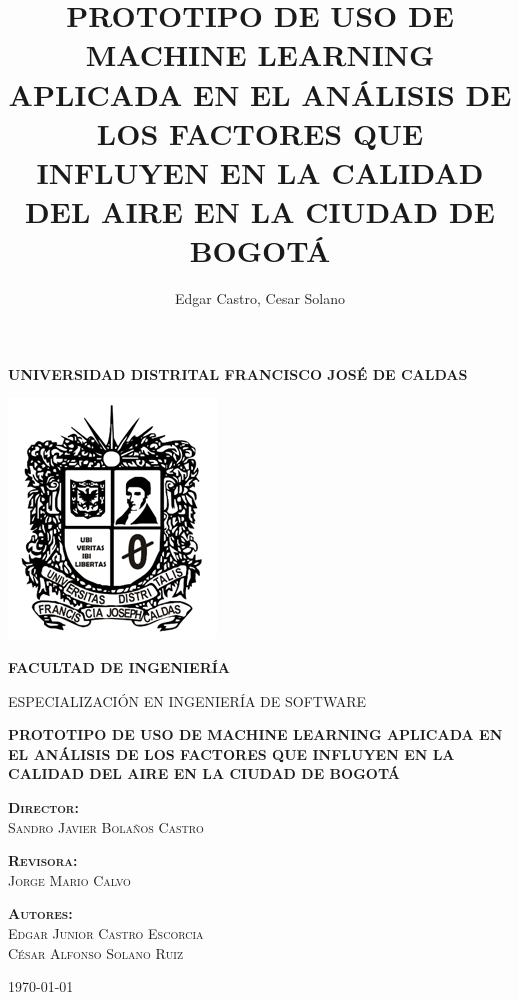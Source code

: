 \documentclass[a4paper, fontsize=16pt, oneside]{book}
\title{PROTOTIPO DE USO DE MACHINE LEARNING APLICADA EN EL ANÁLISIS DE LOS FACTORES QUE INFLUYEN EN LA CALIDAD DEL AIRE EN LA CIUDAD DE BOGOTÁ}
\author{Edgar Castro, Cesar Solano}
\begin{document}
	
	
\begin{titlepage}	
	\begin{center}
		{\scshape\Large\bfseries UNIVERSIDAD DISTRITAL FRANCISCO JOSÉ DE CALDAS \par}
		\vspace{1cm}
		\includegraphics{images/Escudo.png}\par
		\vspace{0,7cm}
		{\scshape\Large\bfseries FACULTAD DE INGENIERÍA \par}
		\vspace{0,5cm}
		{\scshape\normalsize ESPECIALIZACIÓN EN INGENIERÍA DE SOFTWARE\par}
		\vspace{0.3cm}
		
		{\scshape\normalsize\bfseries PROTOTIPO DE USO DE MACHINE LEARNING APLICADA EN EL ANÁLISIS DE LOS FACTORES QUE INFLUYEN EN LA CALIDAD DEL AIRE EN LA CIUDAD DE BOGOTÁ\par}
		\vspace{2cm}
	\end{center}

	\begin{multicols}{3}
		\begin{center}
			\scshape\normalsize\textbf{Director:}\\ Sandro Javier Bolaños Castro \par
			
			\columnbreak
			\scshape\normalsize\textbf{Revisora:}\\Jorge Mario Calvo \par
			
			\columnbreak
			\scshape\normalsize\textbf{Autores:}\\Edgar Junior Castro Escorcia\\ César Alfonso Solano Ruiz\par
		\end{center}
	\end{multicols}

	\vfill

	{\begin{center}
			\scshape\Large\monthyeardate\today
	\end{center}}
	
\end{titlepage}
\end{document}
